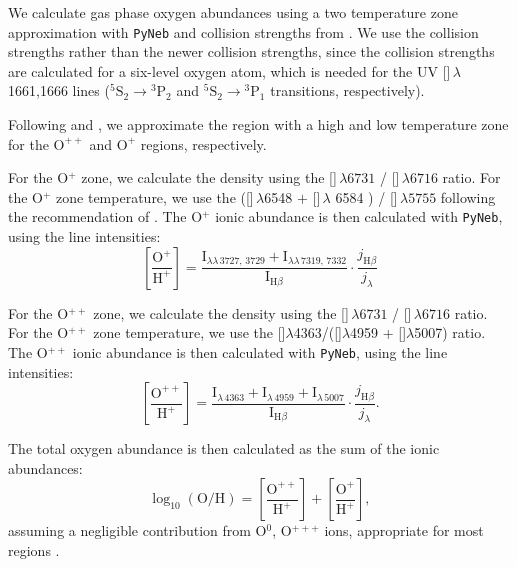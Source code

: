\documentclass[trackchanges, preprint2]{aastex62}
\newcommand{\hii}{\ion{H}{2}}
\newcommand{\nii}{[\ion{N}{2}]}
\newcommand{\sii}{[\ion{S}{2}]}
\newcommand{\oiii}{[\ion{O}{3}]}
\begin{document}
We calculate gas phase oxygen abundances using a two temperature zone approximation with {\tt PyNeb} \citep{PyNeb} and collision strengths from \citet{Aggarwal+1999}. We use the \citet{Aggarwal+1999} collision strengths rather than the newer \citet{Storey+2014} collision strengths, since the \citet{Aggarwal+1999} collision strengths are calculated for a six-level oxygen atom, which is needed for the UV \oiii$\,\lambda$1661,1666 lines (${}^5\mathrm{S}_2 \rightarrow {}^3\mathrm{P}_2$ and ${}^5\mathrm{S}_2 \rightarrow {}^3\mathrm{P}_1$ transitions, respectively).

Following \citet{Garnett+1992} and \citet{Berg+2015}, we approximate the \hii{} region with a high and low temperature zone for the $\mathrm{O}^{++}$ and $\mathrm{O}^{+}$ regions, respectively.

For the O$^{+}$ zone, we calculate the density using the \sii$\,\lambda 6731$ / \sii$\,\lambda 6716$ ratio. For the O$^{+}$ zone temperature, we use the (\nii$\,\lambda$6548 $+$ \nii$\,\lambda$ 6584 ) / \nii$\,\lambda 5755$ following the recommendation of \citet{Berg+2015}. The O$^{+}$ ionic abundance is then calculated with {\tt PyNeb}, using the line intensities:
\begin{equation}
    \left[ \frac{\mathrm{O}^{+}}{\mathrm{H}^{+}} \right] = \frac{\mathrm{I}_{\lambda\lambda\,3727,\,3729} + \mathrm{I}_{\lambda\lambda \,7319,\,7332}}{\mathrm{I}_{\mathrm{H}\beta}} \cdot \frac{j_{\mathrm{H}\beta}}{j_{\lambda}}
\end{equation}

For the O$^{++}$ zone, we calculate the density using the \sii$\,\lambda 6731$ / \sii$\,\lambda 6716$ ratio. For the O$^{++}$ zone temperature, we use the \oiii$\lambda$4363/(\oiii$\lambda$4959 + \oiii$\lambda$5007) ratio. The O$^{++}$ ionic abundance is then calculated with {\tt PyNeb}, using the line intensities:
\begin{equation}
    \left[ \frac{\mathrm{O}^{++}}{\mathrm{H}^{+}} \right] = \frac{\mathrm{I}_{\lambda\,4363} + \mathrm{I}_{\lambda\,4959} + \mathrm{I}_{\lambda\,5007}}{\mathrm{I}_{\mathrm{H}\beta}} \cdot \frac{j_{\mathrm{H}\beta}}{j_{\lambda}}.
\end{equation}

The total oxygen abundance is then calculated as the sum of the ionic abundances:
\begin{equation}
    \log_{10}(\mathrm{O}/\mathrm{H}) = \left[ \frac{\mathrm{O}^{++}}{\mathrm{H}^{+}} \right] + \left[ \frac{\mathrm{O}^{+}}{\mathrm{H}^{+}} \right],
\end{equation}
assuming a negligible contribution from O$^{0}$, O$^{+++}$ ions, appropriate for most \hii{} regions \citep{Berg+2016}.
\end{document}
